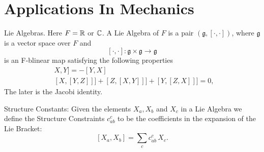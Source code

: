 \section{Applications In Mechanics}

\begin{definition}
Lie Algebras. Here $F = \mathbb{R}$ or $\mathbb{C}$. A Lie Algebra of $F$ is a pair $(\mathfrak{g}, [\cdot,\cdot])$, where $\mathfrak{g}$ is a vector space over $F$ and
$$[\cdot,\cdot]: \mathfrak{g} \times \mathfrak{g} \rightarrow \mathfrak{g}$$ is an F-blinear map satisfying the following properties 
 \begin{align*}
 &X, Y] = - [Y,X]\\
 &[X,[Y,Z]]] +  [Z,[X,Y]]] +  [Y,[Z,X]]] = 0,\
 \end{align*}The later is the Jacobi identity.
\end{definition}

\begin{definition}
Structure Constants: Given the elements $X_a, X_b$ and $X_c$ in a Lie Algebra we define the Structure Constraints $c_{ab}^c$ to be the coefficients in the expansion of the Lie Bracket: 
$$[X_a,X_b] = \sum_c c_{ab}^c\, X_c.$$
\end{definition}

